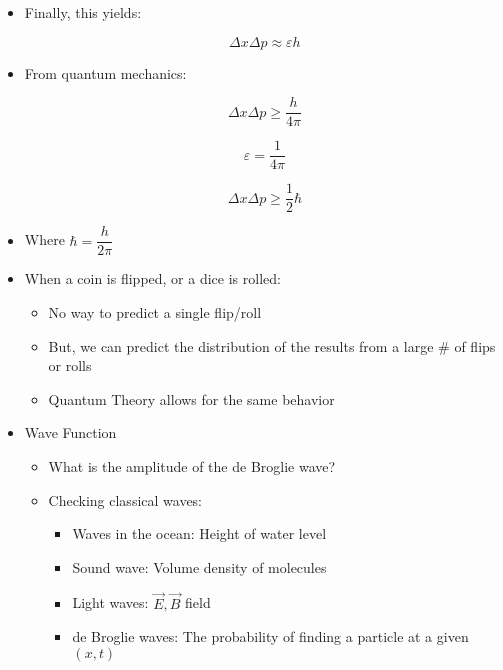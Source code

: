 \begin{itemize}
  \item Finally, this yields:

    $$\Delta x\Delta p\approx \varepsilon h$$

  \item From quantum mechanics:

    $$\Delta x\Delta p\geq\frac{h}{4\pi}$$

    $$\varepsilon=\frac{1}{4\pi}$$

    $$\Delta x \Delta p \geq \frac{1}{2}\hbar$$

  \item Where $\hbar=\dfrac{h}{2\pi}$

  \item When a coin is flipped, or a dice is rolled:

    \begin{itemize}

      \item No way to predict a single flip/roll

      \item But, we can predict the distribution of the results from a large \# of flips or rolls

      \item Quantum Theory allows for the same behavior

    \end{itemize}
    
  \item Wave Function

    \begin{itemize}

      \item What is the amplitude of the de Broglie wave?

      \item Checking classical waves:

        \begin{itemize}

          \item Waves in the ocean: Height of water level

          \item Sound wave: Volume density of molecules

          \item Light waves: $\overrightarrow{E},\overrightarrow{B}$ field

          \item de Broglie waves: The probability of finding a particle at a given $(x,t)$


\end{itemize}
\end{itemize}
\end{itemize}

